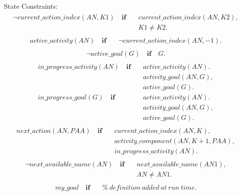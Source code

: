 \documentclass[11pt, oneside]{article}
\begin{document}
State Constraints:
\begin{align}\begin{split}
\neg current\_action\_index(AN, K1)  \quad  \mathbf{if}\quad & current\_action\_index(AN, K2), \\
 \quad & K1\neq K2.
 \end{split}\end{align}
\begin{align}\begin{split}
 active\_activity(AN)\quad  \mathbf{if} \quad & \neg current\_action\_index(AN, -1). 
\end{split}\end{align}
\begin{align}\begin{split}
\neg active\_goal(G) \quad \mathbf{if} \quad G. 
\end{split}\end{align}
\begin{align}\begin{split}
in\_progress\_activity(AN) \quad \mathbf{if}\quad &active\_activity(AN).\\
&activity\_goal(AN, G),\\
&active\_goal(G).\\
in\_progress\_goal(G) \quad \mathbf{if}\quad &active\_activity(AN).\\
&activity\_goal(AN, G),\\
&active\_goal(G). 
\end{split}\end{align}
\begin{align}\begin{split}
next\_action(AN, PAA)\quad \mathbf{if}\quad & current\_action\_index(AN, K),\\
&activity\_component(AN, K+1, PAA),\\
&in\_progress\_activity(AN).
\end{split}\end{align}
\begin{align}\begin{split}
\neg next\_available\_name(AN) \quad \mathbf{if}\quad & next\_available\_name(AN1), \\
&AN\neq AN1.
\end{split}\end{align}
\begin{align}\begin{split}
my\_goal \quad \mathbf{if}\quad & \%~definition~added~at~run~time.
\end{split}\end{align}
\end{document}
